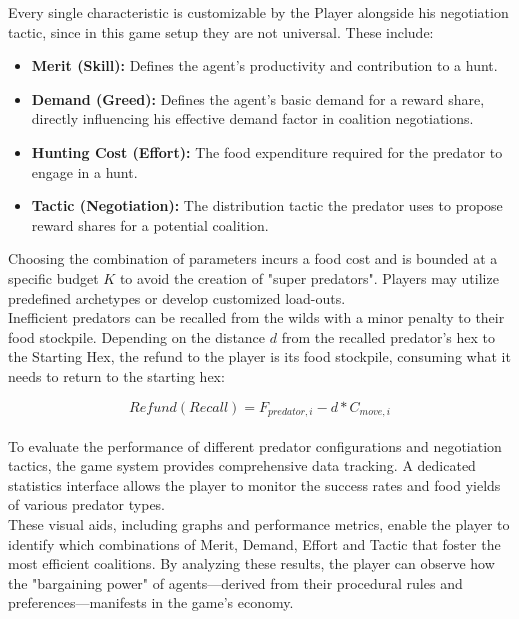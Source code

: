 \documentclass[12pt,a4paper]{report}
\begin{document}
	Every single characteristic is customizable by the Player alongside his negotiation tactic, since in this game setup they are not universal. These include: \\
	
	\begin{itemize}
		
		\item \textbf{Merit (Skill):} Defines the agent's productivity and contribution to a hunt.
		
		\item \textbf{Demand (Greed):} Defines the agent's basic demand for a reward share, directly influencing his effective demand factor in coalition negotiations.
		
		\item \textbf{Hunting Cost (Effort):} The food expenditure required for the predator to engage in a hunt.
		
		\item \textbf{Tactic (Negotiation):} The distribution tactic the predator uses to propose reward shares for a potential coalition. \\
		
	\end{itemize}
	
	Choosing the combination of parameters incurs a food cost and is bounded at a specific budget $K$ to avoid the creation of "super predators". Players may utilize predefined archetypes or develop customized load-outs. \\
	
	Inefficient predators can be recalled from the wilds with a minor penalty to their food stockpile. Depending on the distance $d$ from the recalled predator's hex to the Starting Hex, the refund to the player is its food stockpile, consuming what it needs to return to the starting hex: 
	
	\[ Refund(Recall) = F_{predator,i} - d * C_{move,i} \] \\
	
	To evaluate the performance of different predator configurations and negotiation tactics, the game system provides comprehensive data tracking. A dedicated statistics interface allows the player to monitor the success rates and food yields of various predator types. \\
	
	These visual aids, including graphs and performance metrics, enable the player to identify which combinations of Merit, Demand, Effort and Tactic that foster the most efficient coalitions. By analyzing these results, the player can observe how the "bargaining power" of agents—derived from their procedural rules and preferences—manifests in the game's economy. \\
	
\end{document}
